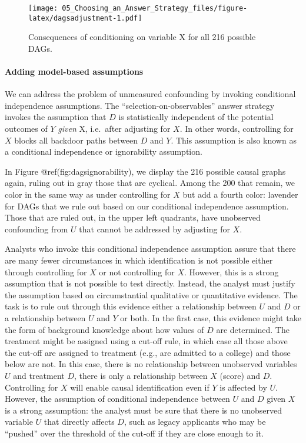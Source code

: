 \documentclass[
]{article}
\begin{document}
\begin{figure}
\centering
\texttt{[image: 05\_Choosing\_an\_Answer\_Strategy\_files/figure-latex/dagsadjustment-1.pdf]}
\caption{Consequences of conditioning on variable X for all 216 possible
DAGs.}
\end{figure}

\hypertarget{adding-model-based-assumptions}{%
\paragraph{Adding model-based
assumptions}\label{adding-model-based-assumptions}}

We can address the problem of unmeasured confounding by invoking
conditional independence assumptions. The ``selection-on-observables''
answer strategy invokes the assumption that \(D\) is statistically
independent of the potential outcomes of \(Y\) \emph{given} X,
i.e.~after adjusting for \(X\). In other words, controlling for \(X\)
blocks all backdoor paths between \(D\) and \(Y\). This assumption is
also known as a conditional independence or ignorability assumption.

In Figure @ref(fig:dagsignorability), we display the 216 possible causal
graphs again, ruling out in gray those that are cyclical. Among the 200
that remain, we color in the same way as under controlling for \(X\) but
add a fourth color: lavender for DAGs that we rule out based on our
conditional independence assumption. Those that are ruled out, in the
upper left quadrants, have unobserved confounding from \(U\) that cannot
be addressed by adjusting for \(X\).

Analysts who invoke this conditional independence assumption assure that
there are many fewer circumstances in which identification is not
possible either through controlling for \(X\) or not controlling for
\(X\). However, this is a strong assumption that is not possible to test
directly. Instead, the analyst must justify the assumption based on
circumstantial qualitative or quantitative evidence. The task is to rule
out through this evidence either a relationship between \(U\) and \(D\)
or a relationship between \(U\) and \(Y\) or both. In the first case,
this evidence might take the form of background knowledge about how
values of \(D\) are determined. The treatment might be assigned using a
cut-off rule, in which case all those above the cut-off are assigned to
treatment (e.g., are admitted to a college) and those below are not. In
this case, there is no relationship between unobserved variables \(U\)
and treatment \(D\), there is only a relationship between \(X\) (score)
and \(D\). Controlling for \(X\) will enable causal identification even
if \(Y\) is affected by \(U\). However, the assumption of conditional
independence between \(U\) and \(D\) given \(X\) is a strong assumption:
the analyst must be sure that there is no unobserved variable \(U\) that
directly affects \(D\), such as legacy applicants who may be ``pushed''
over the threshold of the cut-off if they are close enough to it.
\end{document}
